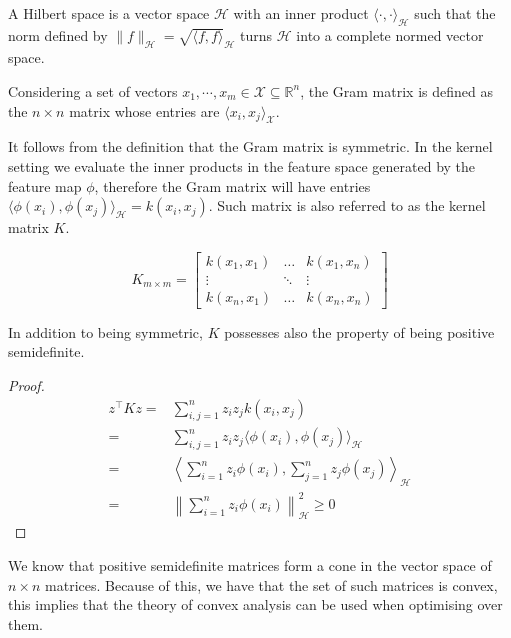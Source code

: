 \begin{definition}
    A Hilbert space is a vector space $\mathcal{H}$ with an inner product $\langle \cdot, \cdot \rangle_{\mathcal{H}}$ such that the norm defined by $\|f\|_{\mathcal{H}}=\sqrt{\langle f, f \rangle}_{\mathcal{H}}$
turns $\mathcal{H}$ into a complete normed vector space.
\end{definition}




\begin{definition}
    Considering a set of vectors $x_1, \cdots, x_m \in \mathcal{X} \subseteq \mathbb{R}^n$, the Gram matrix is defined as the $n\times n$ matrix whose entries are $\langle x_i, x_j \rangle_{\mathcal{X}}$.    
\end{definition}

It follows from the definition that the Gram matrix is symmetric.
In the kernel setting we evaluate the inner products in the feature space generated by the feature map $\phi$, therefore the Gram matrix will have entries $\langle \phi(x_i), \phi(x_j) \rangle_{\mathcal{H}}= k(x_i, x_j)$. Such matrix is also referred to as the kernel matrix $K$.

\[
K_{m\times m}=
\begin{bmatrix}
    k(x_1,x_1)       &  \dots & k(x_1,x_n) \\
    \vdots       & \ddots & \vdots \\
    k(x_n, x_1)       & \dots & k(x_n, x_n)
\end{bmatrix}
\]

\begin{proposition}
    In addition to being symmetric, $K$ possesses also the property of being positive semidefinite.    
\end{proposition}

\begin{proof}
    $$
    \begin{aligned}
        z^\intercal K z =& \sum_{i,j=1}^n z_i z_j k(x_i,x_j)
        \\
        =& \sum_{i,j=1}^n z_i z_j \langle \phi(x_i), \phi(x_j) \rangle_{\mathcal{H}}
        \\
        =& \left\langle \sum_{i=1}^n z_i \phi(x_i), \sum_{j=1}^n z_j \phi(x_j)\right\rangle_{\mathcal{H}}
        \\
        =& \left\|\sum_{i=1}^n z_i \phi(x_i) \right\|_{\mathcal{H}}^2 \geq 0
    \end{aligned}
    $$
\end{proof}
We know that positive semidefinite matrices form a cone in the vector space of $n\times n$ matrices. Because of this, we have that the set of such matrices is convex, this implies that the theory of convex analysis can be used when optimising over them.


